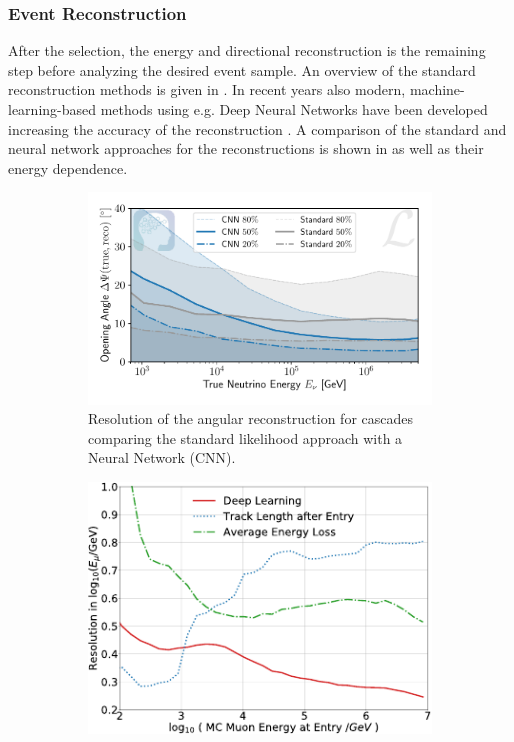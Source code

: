 \subsubsection{Event Reconstruction}

After the selection, the energy and directional reconstruction is the remaining step before analyzing the desired event sample.
An overview of the standard reconstruction methods is given in \cite{AMANDA2004Reco, IceCube2014Ereco}.
In recent years also modern, machine-learning-based methods using e.g. Deep Neural Networks have been developed increasing the accuracy of the reconstruction \cite{Huennefeld17ICRC, Huennefeld17Master, IceCube20DNN}.
A comparison of the standard and neural network approaches for the reconstructions is shown in  as well as their energy dependence.
\begin{figure}
    \centering
    \begin{subfigure}{0.55\textwidth}
        \centering
        \includegraphics[width=\textwidth]{./images/icecube_resolution_cascade_angular.pdf}
        \caption{Resolution of the angular reconstruction for cascades comparing the standard likelihood approach with a Neural Network (CNN). \cite{IceCube20DNN}}
        \label{fig:icecube_angular_resolution}
    \end{subfigure}
    \hfill
    \begin{subfigure}{0.43\textwidth}
        \centering
        \includegraphics[width=\textwidth]{./images/icecube_resolution_muon_energy.pdf}

\end{subfigure}
\end{figure}
